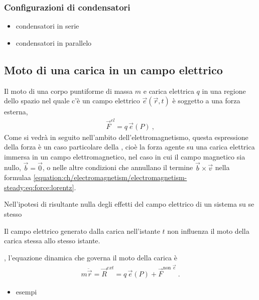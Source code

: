 \documentclass[letterpaper,10pt,italian]{jupyterBook}
\begin{document}
\subsubsection{Configurazioni di condensatori}
\label{\detokenize{ch/electromagnetism/electrostatics:configurazioni-di-condensatori}}\begin{itemize}
\item {} 
\sphinxAtStartPar
condensatori in serie

\item {} 
\sphinxAtStartPar
condensatori in parallelo

\end{itemize}


\subsection{Moto di una carica in un campo elettrico}
\label{\detokenize{ch/electromagnetism/electrostatics:moto-di-una-carica-in-un-campo-elettrico}}
\sphinxAtStartPar
Il moto di una corpo puntiforme di massa \(m\) e carica elettrica \(q\) in una regione dello spazio nel quale c’è un campo elettrico \(\vec{e}(\vec{r},t)\) è soggetto a una forza esterna,
\begin{equation}\label{equation:ch/electromagnetism/electrostatics:eq:force:lorentz:electric}
\begin{split}\vec{F}^{el} = q \, \vec{e}(P) \ ,\end{split}
\end{equation}
\sphinxAtStartPar
Come si vedrà in seguito nell’ambito dell’elettromagnetismo, questa espressione della forza è un caso particolare della {\hyperref[\detokenize{ch/electromagnetism/electromagnetism-steady:physics-hs-electromagnetism-lorentz}]{}}, cioè la forza agente su una carica elettrica immersa in un campo elettromagnetico, nel caso in cui il campo magnetico sia nullo, \(\vec{b} = \vec{0}\), o nelle altre condizioni che annullano il termine \(\vec{b} \times \vec{v}\) nella formulaa \eqref{equation:ch/electromagnetism/electromagnetism-steady:eq:force:lorentz}.

\sphinxAtStartPar
Nell’ipotesi di risultante nulla degli effetti del campo elettrico di un sistema su se stesso%
\begin{footnote}[2]\sphinxAtStartFootnote
Il campo elettrico generato dalla carica nell’istante \(t\) non influenza il moto della carica stessa allo stesso istante.
%
\end{footnote}, l’equazione dinamica che governa il moto della carica è
\begin{equation*}
\begin{split}m \ddot{ \vec{r} } = \vec{R}^{ext} = q \, \vec{e}(P) + \vec{F}^{\text{non }\vec{e}} \ .\end{split}
\end{equation*}\begin{itemize}
\item {} 
\sphinxAtStartPar
{} esempi

\end{itemize}
\end{document}
